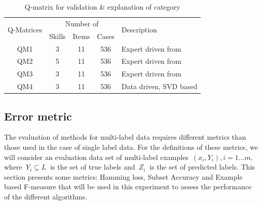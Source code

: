 \documentclass[11pt]{article}
\begin{document}
\begin{table}[h] 
\begin{center}
  \caption{Q-matrix for validation \& explanation of category}\label{tab:qm}
  \begin{tabular}{|ccccp{4cm}<{\raggedright}|}
  \hline
  \toprule
\multirow{2}{*}{Q-Matrices} & \multicolumn{3}{c}{Number of} & \multirow{2}{*|}{Description} \\
  \cline{2-4}
  & Skills &  Items & \multicolumn{1}{c}{Cases} & \\
  \midrule
QM1 & 3 & 11 & 536 & {Expert driven from \cite{henson2009defining} } \\
	\hline
QM2 & 5 & 11 & 536 & {Expert driven from \cite{de2008empirically} } \\  
 	\hline
QM3 & 3 & 11 & 536 & {Expert driven from \cite{CDM}} \\  
  	\hline 
QM4 & 3 & 11 & 536 & {Data driven, SVD based} \\  
  	\hline
  	\end{tabular}  
\end{center}	
\end{table}





\subsection{Error metric}\label{sec:eval-meas-princ}

The evaluation of methods for multi-label data requires different metrics than those used in the case of single label data. For the definitions of these metrics, we will consider an evaluation data set of multi-label examples~$(x_i ,Y_i ), i = 1...m, $ where~$ Y_i \subseteq L~$ is the set of true labels and~$ Z_i~$ is the set of predicted labels. This section presents some metrics: Hamming loss, Subset Accuracy and Example based F-measure \cite{Tsoumakas2010MLD} that will be used in this experiment to
assess the performance of the different algorithms. 
\end{document}
